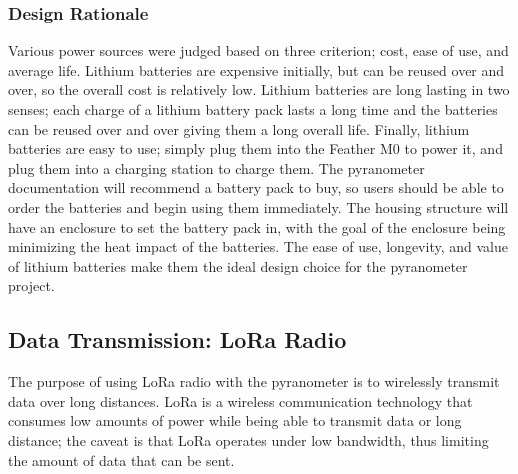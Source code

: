 \documentclass[10pt,draftclsnofoot,onecolumn,letterpaper]{article}
\begin{document}
\subsubsection{Design Rationale}
Various power sources were judged based on three criterion; cost, ease of use, and average life. Lithium batteries are expensive initially, but can be reused over and over, so the overall cost is relatively low. Lithium batteries are long lasting in two senses; each charge of a lithium battery pack lasts a long time and the batteries can be reused over and over giving them a long overall life. Finally, lithium batteries are easy to use; simply plug them into the Feather M0 to power it, and plug them into a charging station to charge them. The pyranometer documentation will recommend a battery pack to buy, so users should be able to order the batteries and begin using them immediately. The housing structure will have an enclosure to set the battery pack in, with the goal of the enclosure being minimizing the heat impact of the batteries. The ease of use, longevity, and value of lithium batteries make them the ideal design choice for the pyranometer project.

\subsection{Data Transmission: LoRa Radio}
The purpose of using LoRa radio with the pyranometer is to wirelessly transmit data over long distances. LoRa is a wireless communication technology that consumes low amounts of power while being able to transmit data or long distance; the caveat is that LoRa operates under low bandwidth, thus limiting the amount of data that can be sent.
\end{document}
